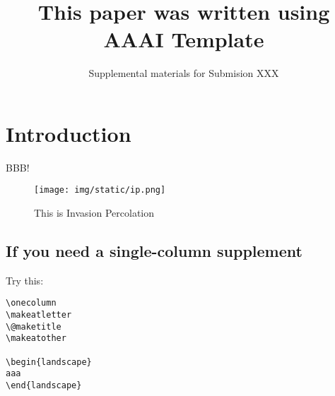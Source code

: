 

\usepackage{pdflscape}
\renewcommand{\thesection}{S\arabic{section}}
\renewcommand{\thetable}{S\arabic{table}}
\renewcommand{\thefigure}{S\arabic{figure}}

\pagestyle{empty}

\author{Supplemental materials for Submision XXX}
\title{This paper was written using AAAI Template}

\maketitle

\section{Introduction}

BBB!  \cite{Asai2016}

\begin{figure}[tb]
 \texttt{[image: img/static/ip.png]}
 \caption{This is Invasion Percolation}
 \label{fig:ip-supplement}
\end{figure}

\subsection{If you need a single-column supplement}

Try this:

\begin{verbatim}
\onecolumn
\makeatletter
\@maketitle
\makeatother

\begin{landscape}
aaa
\end{landscape}
\end{verbatim}

\fontsize{9.5pt}{10.5pt}
\selectfont
 



